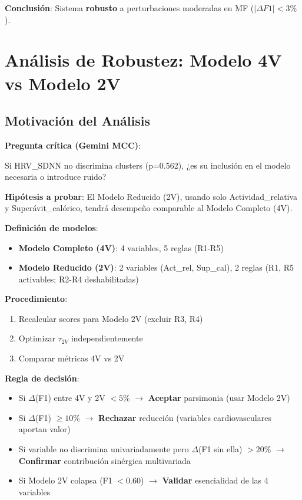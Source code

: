 \documentclass[12pt,letterpaper,twoside]{report}
\begin{document}
\begin{calculobox}
\begin{calculobox}
\textbf{Conclusión}: Sistema \textbf{robusto} a perturbaciones moderadas en MF ($|\Delta F1| < 3\%$).
\end{calculobox}

\section{Análisis de Robustez: Modelo 4V vs Modelo 2V}

\subsection{Motivación del Análisis}

\begin{hipotesisbox}
\textbf{Pregunta crítica (Gemini MCC)}:

Si HRV\_SDNN no discrimina clusters (p=0.562), ¿es su inclusión en el modelo necesaria o introduce ruido?

\textbf{Hipótesis a probar}: El Modelo Reducido (2V), usando solo Actividad\_relativa y Superávit\_calórico, tendrá desempeño comparable al Modelo Completo (4V).
\end{hipotesisbox}

\begin{estadisticobox}
\textbf{Definición de modelos}:

\begin{itemize}[noitemsep]
    \item \textbf{Modelo Completo (4V)}: 4 variables, 5 reglas (R1-R5)
    \item \textbf{Modelo Reducido (2V)}: 2 variables (Act\_rel, Sup\_cal), 2 reglas (R1, R5 activables; R2-R4 deshabilitadas)
\end{itemize}

\textbf{Procedimiento}:
\begin{enumerate}[noitemsep]
    \item Recalcular scores para Modelo 2V (excluir R3, R4)
    \item Optimizar $\tau_{2V}$ independientemente
    \item Comparar métricas 4V vs 2V
\end{enumerate}
\end{estadisticobox}

\begin{reglabox}
\textbf{Regla de decisión}:

\begin{itemize}[noitemsep]
    \item Si $\Delta$(F1) entre 4V y 2V $< 5\%$ $\to$ \textbf{Aceptar} parsimonia (usar Modelo 2V)
    \item Si $\Delta$(F1) $\geq 10\%$ $\to$ \textbf{Rechazar} reducción (variables cardiovasculares aportan valor)
    \item Si variable no discrimina univariadamente pero $\Delta$(F1 sin ella) $> 20\%$ $\to$ \textbf{Confirmar} contribución sinérgica multivariada
    \item Si Modelo 2V colapsa (F1 $< 0.60$) $\to$ \textbf{Validar} esencialidad de las 4 variables
\end{itemize}
\end{reglabox}


\end{calculobox}
\end{document}
